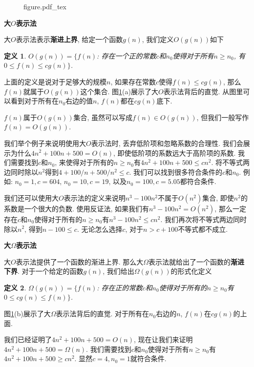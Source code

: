 \documentclass[oneside,10pt,fontset=none]{ctexbook}
\newtheorem{definition}{定义}
\numberwithin{definition}{chapter}
\numberwithin{theorem}{chapter}
\numberwithin{lemma}{chapter}
\begin{document}
\begin{figure}[htbp]
    \def\svgwidth{\columnwidth}
    {figure.pdf_tex}
    \label{fig:不同渐进表示法的示意图}
\end{figure}

\textbf{大$O$表示法}

大$O$表示法表示\textbf{渐进上界}, 给定一个函数$g(n)$, 我们定义$O(g(n))$如下

\begin{definition}
$O(g(n))=\{f(n)$: 存在一个正的常数$c$和$n_0$使得对于所有$n\geq n_0$, 有$0\leq f(n)\leq cg(n)\}$.
\end{definition}

上面的定义是说对于足够大的规模$n$, 如果存在常数$c$使得$f(n)\leq cg(n)$, 那么$f(n)$就属于$O(g(n))$这个集合. 图\ref{fig:不同渐进表示法的示意图}(a)展示了大$O$表示法背后的直觉. 从图里可以看到对于所有在$n_0$右边的值$n$, $f(n)$都在$cg(n)$底下.

$f(n)$属于$O(g(n))$集合, 虽然可以写成$f(n) \in O(g(n))$, 但我们一般写作$f(n)=O(g(n))$.

我们举个例子来说明使用大$O$表示法时, 丢弃低阶项和忽略系数的合理性. 我们会展示为什么$4n^2+100n+500=O(n)$, 即使低阶项的系数远大于高阶项的系数. 我们需要找到$c$和$n_0$, 来使得对于所有的$n\geq n_0$有$4n^2+100n+500\leq cn^2$. 将不等式两边同时除以$n^2$得到$4+100/n+500/n^2\leq c$. 我们可以找到很多符合条件的$c$和$n_0$. 例如: $n_0=1,c=604$, $n_0=10, c=19$, 以及$n_0=100,c=5.05$都符合条件.

我们还可以使用大$O$表示法的定义来说明$n^3-100n^2$不属于$O(n^2)$集合, 即使$n^2$的系数是一个很大的负数. 使用反证法, 如果我们有$n^3-100n^2=O(n^2)$, 那么一定存在$c$和$n_0$使得对于所有的$n\geq n_0$有$n^3-100n^2\leq cn^2$. 我们再次将不等式两边同时除以$n^2$, 得到$n-100\leq c$. 无论怎么选择$c$, 对于$n>c+100$不等式都不成立.

\textbf{大$\Omega$表示法}

大$O$表示法提供了一个函数的渐进上界. 那么大$\Omega$表示法就给出了一个函数的\textbf{渐进下界}. 对于一个给定的函数$g(n)$, 我们给出$\Omega(g(n))$的形式化定义

\begin{definition}
$\Omega(g(n))=\{f(n)$: 存在正的常数$c$和$n_0$使得对于所有的$n\geq n_0$有$0\leq cg(n)\leq f(n)\}$.
\end{definition}

图\ref{fig:不同渐进表示法的示意图}(b)展示了大$\Omega$表示法背后的直觉. 对于所有在$n_0$右边的$n$, $f(n)$在$cg(n)$的上面.

我们已经证明了$4n^2+100n+500=O(n)$, 现在让我们来证明$4n^2+100n+500=\Omega(n)$. 我们需要找到$c$和$n_0$使得对于所有$n\geq n_0$有$4n^2+100n+500\geq cn^2$. 显然$c=4,n_0=1$就符合条件.
\end{document}
